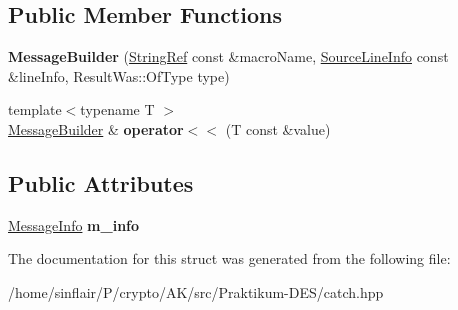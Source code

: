 \subsection*{Public Member Functions}
\begin{DoxyCompactItemize}
\item 
\mbox{\label{structCatch_1_1MessageBuilder_ac34832ca527a758f000ac233d32dd068}} 
{\bfseries Message\+Builder} (\hyperlink{classCatch_1_1StringRef}{String\+Ref} const \&macro\+Name, \hyperlink{structCatch_1_1SourceLineInfo}{Source\+Line\+Info} const \&line\+Info, Result\+Was\+::\+Of\+Type type)
\item 
\mbox{\label{structCatch_1_1MessageBuilder_a20fa48d069b20dddcc2d3df8abb123c1}} 
{\footnotesize template$<$typename T $>$ }\\\hyperlink{structCatch_1_1MessageBuilder}{Message\+Builder} \& {\bfseries operator$<$$<$} (T const \&value)
\end{DoxyCompactItemize}
\subsection*{Public Attributes}
\begin{DoxyCompactItemize}
\item 
\mbox{\label{structCatch_1_1MessageBuilder_a979f1c2b36d78f80ee275bfa5ba0209f}} 
\hyperlink{structCatch_1_1MessageInfo}{Message\+Info} {\bfseries m\+\_\+info}
\end{DoxyCompactItemize}


The documentation for this struct was generated from the following file\+:\begin{DoxyCompactItemize}
\item 
/home/sinflair/\+P/crypto/\+A\+K/src/\+Praktikum-\/\+D\+E\+S/catch.\+hpp\end{DoxyCompactItemize}
